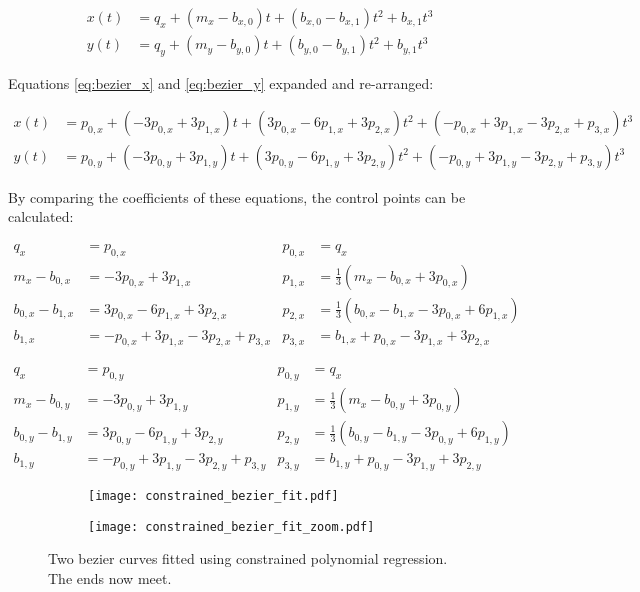 \begin{align}
    x(t) &= q_x + (m_x - b_{x,0}) t + (b_{x,0} - b_{x,1}) t^2 + b_{x,1} t^3 \\
    y(t) &= q_y + (m_y - b_{y,0}) t + (b_{y,0} - b_{y,1}) t^2 + b_{y,1} t^3
\end{align}

Equations \ref{eq:bezier_x} and \ref{eq:bezier_y} expanded and re-arranged:

\begin{align}
    x(t) &= p_{0,x} + (-3p_{0,x} + 3p_{1,x})t + (3p_{0,x} - 6p_{1,x} + 3p_{2,x})t^2 + (-p_{0,x} + 3p_{1,x} - 3p_{2,x} + p_{3,x})t^3 \\
    y(t) &= p_{0,y} + (-3p_{0,y} + 3p_{1,y})t + (3p_{0,y} - 6p_{1,y} + 3p_{2,y})t^2 + (-p_{0,y} + 3p_{1,y} - 3p_{2,y} + p_{3,y})t^3
\end{align}

By comparing  the  coefficients  of  these equations, the control points can be
calculated:

\begin{align}
    q_x               &= p_{0,x}              &
    p_{0,x} &= q_x \\
    m_x - b_{0,x}     &= -3p_{0,x} + 3p_{1,x} &
    p_{1,x} &= \frac{1}{3} (m_x - b_{0,x} + 3p_{0,x}) \\
    b_{0,x} - b_{1,x} &= 3p_{0,x} - 6p_{1,x} + 3p_{2,x} &
    p_{2,x} &= \frac{1}{3} (b_{0,x} - b_{1,x} - 3p_{0,x} + 6p_{1,x}) \\
    b_{1,x}           &= -p_{0,x} + 3p_{1,x} - 3p_{2,x} + p_{3,x} &
    p_{3,x} &= b_{1,x} + p_{0,x} - 3p_{1,x} + 3p_{2,x}
\end{align}

\begin{align}
    q_x               &= p_{0,y}              &
    p_{0,y} &= q_x \\
    m_x - b_{0,y}     &= -3p_{0,y} + 3p_{1,y} &
    p_{1,y} &= \frac{1}{3} (m_x - b_{0,y} + 3p_{0,y}) \\
    b_{0,y} - b_{1,y} &= 3p_{0,y} - 6p_{1,y} + 3p_{2,y} &
    p_{2,y} &= \frac{1}{3} (b_{0,y} - b_{1,y} - 3p_{0,y} + 6p_{1,y}) \\
    b_{1,y}           &= -p_{0,y} + 3p_{1,y} - 3p_{2,y} + p_{3,y} &
    p_{3,y} &= b_{1,y} + p_{0,y} - 3p_{1,y} + 3p_{2,y}
\end{align}

\begin{figure}
    \centering
    \begin{subfigure}{.45\linewidth}
        \centering
        \texttt{[image: constrained\_bezier\_fit.pdf]}
        \caption{}
    \end{subfigure}
        \begin{subfigure}{.45\linewidth}
        \centering
        \texttt{[image: constrained\_bezier\_fit\_zoom.pdf]}
        \caption{}
    \end{subfigure}
    \caption{Two bezier curves fitted using constrained polynomial regression.\\The ends now meet.}
    \label{fig:constrained_bezier_fit}
\end{figure}

